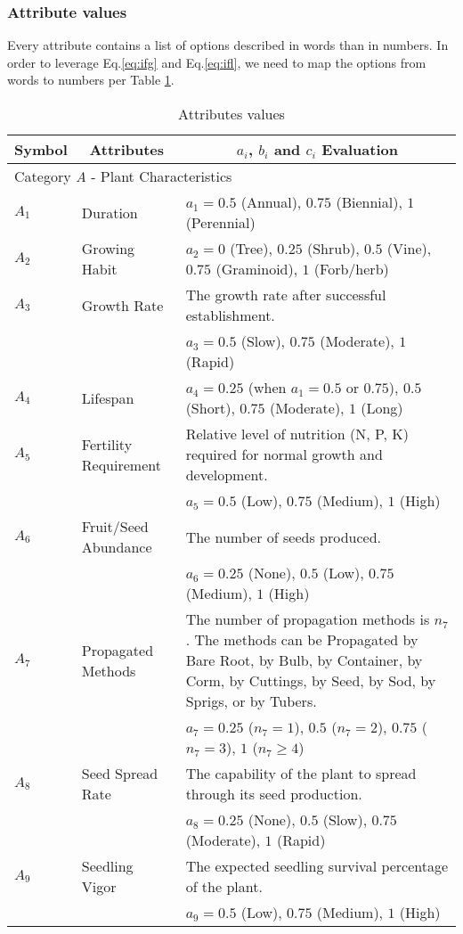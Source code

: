 \documentclass[12pt]{article}
\begin{document}
		\subsubsection{Attribute values}
		\label{sec:attr_value}
		
		Every attribute contains a list of options described in words than in numbers.  In order to leverage Eq.\ref{eq:ifg} and Eq.\ref{eq:ifl}, we need to map the options from words to numbers per Table \ref{tb:attributes}.
		\newpage
		{
			\fontsize{10}{14}\selectfont
			{
			\begin{longtable}{p{0.2in}p{1.5in}p{4.3in}}
				
				\caption{Attributes values}
				\label{tb:attributes}\\
				
				\toprule
				\multicolumn{1}{c}{\textbf{Symbol}} 
					& \multicolumn{1}{c}{\textbf{Attributes}}
					& \multicolumn{1}{c}{\textbf{$a_i$, $b_i$ and $c_i$ Evaluation}} \\
			
				\toprule
				\multicolumn{3}{l}{Category \textit{A} - Plant Characteristics}\\
				\midrule
				
				$A_1$ & Duration & $a_1=0.5$ (Annual), $0.75$ (Biennial), $1$ (Perennial)\\
				$A_2$ & Growing Habit & $a_2=0$ (Tree), $0.25$ (Shrub), $0.5$ (Vine), $0.75$ (Graminoid), $1$ (Forb/herb)\\ 
				$A_3$ & Growth Rate & The growth rate after successful establishment.\\
					&& $a_3=0.5$ (Slow), $0.75$ (Moderate), $1$ (Rapid)\\
				$A_4$ & Lifespan & $a_4=0.25$ (when $a_1=0.5$ or $0.75$), $0.5$ (Short), $0.75$ (Moderate), $1$ (Long) \\
				$A_5$ & Fertility Requirement & Relative level of nutrition (N, P, K) required for normal growth and development.\\
					 && $a_5=0.5$ (Low), $0.75$ (Medium), $1$ (High)\\
				$A_6$ & Fruit/Seed Abundance & The number of seeds produced.\\
					&& $a_6=0.25$ (None), $0.5$ (Low), $0.75$ (Medium), $1$ (High)\\
				$A_7$ & Propagated Methods & The number of propagation methods is $n_7$. The methods can be Propagated by Bare Root, by Bulb, by Container, by Corm, by Cuttings, by Seed, by Sod, by Sprigs, or by Tubers. \\
					&& $a_7=0.25$ ($n_7=1$), $0.5$ ($n_7=2$), $0.75$ ($n_7=3$), $1$ ($n_7\geq4$)\\
				$A_8$ & Seed Spread Rate & The capability of the plant to spread through its seed production.\\
					&& $a_8=0.25$ (None), $0.5$ (Slow), $0.75$ (Moderate), $1$ (Rapid)\\
				$A_9$ & Seedling Vigor & The expected seedling survival percentage of the plant.\\
					&& $a_9=0.5$ (Low), $0.75$ (Medium), $1$ (High)\\
				

\end{longtable}}}
\end{document}
